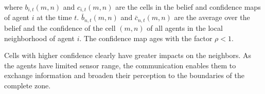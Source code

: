 \documentclass[runningheads]{llncs}%
\begin{document}
where $b_{i,t}(m,n)$ and $c_{i,t}(m,n)$ are the cells in the belief and confidence maps of agent $i$ at the time $t$. $\bar b_{n,t}(m,n)$ and $\bar c_{n,t}(m,n)$ are the average over the belief and the confidence of the cell $(m,n)$ of all agents in the local neighborhood of agent $i$. The confidence map ages with the factor $\rho < 1$. 




Cells with higher confidence clearly have greater impacts on the neighbors. As the agents have limited sensor range, the communication enables them to exchange information and broaden their perception to the boundaries of the complete zone. 
\end{document}
